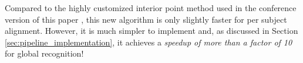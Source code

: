 
Compared to the highly customized interior point method used in the conference
version of this paper \cite{WagnerA2009-CVPR}, this new algorithm is only
slightly faster for per subject alignment. However, it is much simpler to
implement and, as discussed in Section \ref{sec:pipeline_implementation}, it
achieves a \emph{speedup of more than a factor of 10} for global recognition!
